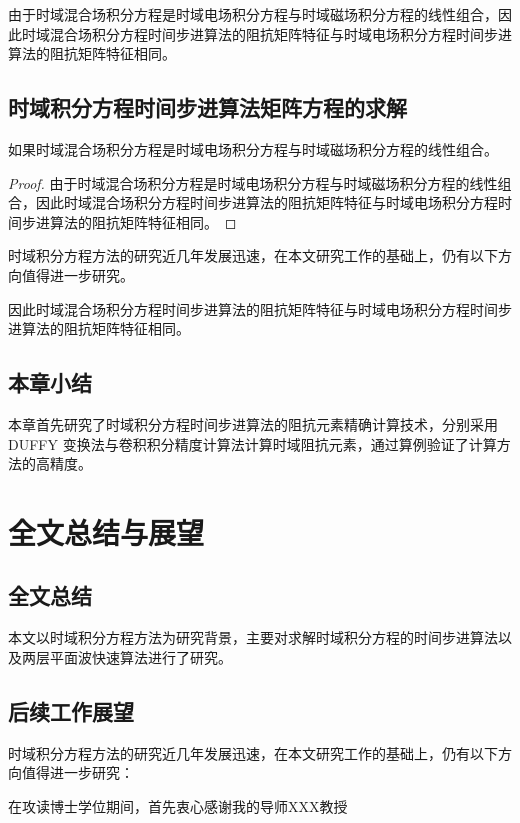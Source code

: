 \documentclass[master]{thesis-uestc}
\begin{document}
由于时域混合场积分方程是时域电场积分方程与时域磁场积分方程的线性组合，因此时域混合场积分方程时间步进算法的阻抗矩阵特征与时域电场积分方程时间步进算法的阻抗矩阵特征相同。

\section{时域积分方程时间步进算法矩阵方程的求解}
\begin{theorem}
如果时域混合场积分方程是时域电场积分方程与时域磁场积分方程的线性组合。
\end{theorem}
\begin{proof}
由于时域混合场积分方程是时域电场积分方程与时域磁场积分方程的线性组合，因此时域混合场积分方程时间步进算法的阻抗矩阵特征与时域电场积分方程时间步进算法的阻抗矩阵特征相同。
\end{proof}
\begin{corollary}
时域积分方程方法的研究近几年发展迅速，在本文研究工作的基础上，仍有以下方向值得进一步研究。
\end{corollary}
\begin{lemma}
因此时域混合场积分方程时间步进算法的阻抗矩阵特征与时域电场积分方程时间步进算法的阻抗矩阵特征相同。
\end{lemma}

\section{本章小结}
本章首先研究了时域积分方程时间步进算法的阻抗元素精确计算技术，分别采用DUFFY 变换法与卷积积分精度计算法计算时域阻抗元素，通过算例验证了计算方法的高精度。

\chapter{全文总结与展望}

\section{全文总结}
本文以时域积分方程方法为研究背景，主要对求解时域积分方程的时间步进算法以及两层平面波快速算法进行了研究。

\section{后续工作展望}
时域积分方程方法的研究近几年发展迅速，在本文研究工作的基础上，仍有以下方向值得进一步研究：

\thesisacknowledgement
在攻读博士学位期间，首先衷心感谢我的导师XXX教授
\end{document}
